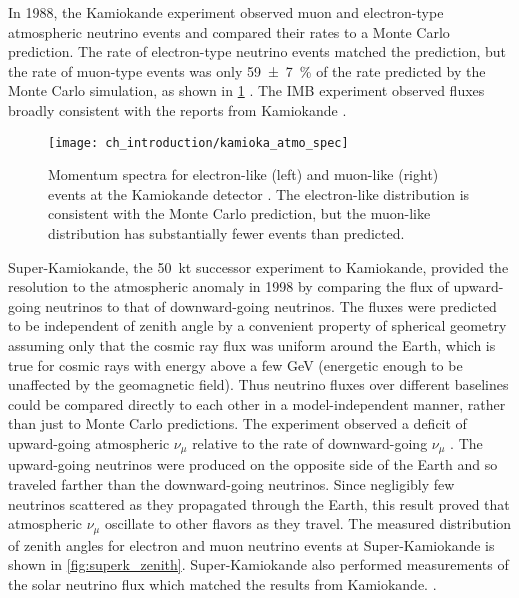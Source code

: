 In 1988, the Kamiokande experiment observed muon and electron-type
atmospheric neutrino events and compared their rates to a Monte Carlo prediction.
The rate of electron-type neutrino events matched the prediction,
but the rate of muon-type events was only \SI{59\pm7}{\percent}
of the rate predicted by the Monte Carlo simulation,
as shown in \cref{fig:kamioka_atmo} \cite{kamiokande_atmo}.
The IMB experiment observed fluxes broadly consistent with
the reports from Kamiokande \cite{imb_atmo}.

\begin{figure}
    \centering
    \texttt{[image: ch\_introduction/kamioka\_atmo\_spec]}
    \caption{
        Momentum spectra for electron-like (left) and muon-like (right) events
        at the Kamiokande detector \cite{kamiokande_atmo}.
        The electron-like distribution is consistent with the Monte Carlo prediction,
        but the muon-like distribution has substantially fewer events
        than predicted.
    }
    \label{fig:kamioka_atmo}
\end{figure}

Super-Kamiokande, the \SI{50}{\kilo\tonne} successor experiment to Kamiokande,
provided the resolution
to the atmospheric anomaly in 1998
by comparing the flux of upward-going neutrinos
to that of downward-going neutrinos.
The fluxes were predicted to be independent of zenith angle
by a convenient property of spherical geometry
assuming only that the cosmic ray flux was uniform around the Earth,
which is true for cosmic rays with energy above a few \si{\GeV}
(energetic enough to be unaffected by the geomagnetic field).
Thus neutrino fluxes over different baselines
could be compared directly to each other
in a model-independent manner, rather than
just to Monte Carlo predictions.
The experiment observed a deficit of upward-going atmospheric $\nu_\mu$
relative to the rate of downward-going $\nu_\mu$ \cite{superk1998}.
The upward-going neutrinos were produced on the opposite side of the Earth
and so traveled farther than the downward-going neutrinos.
Since negligibly few neutrinos scattered as they propagated through the Earth,
this result proved that atmospheric $\nu_\mu$ oscillate to other flavors
as they travel.
The measured distribution of zenith angles for electron and muon neutrino events
at Super-Kamiokande is shown in \cref{fig:superk_zenith}.
Super-Kamiokande also performed measurements of the solar neutrino flux
which matched the results from Kamiokande.
\cite{superk_solar1998,superk_solar2001}.


